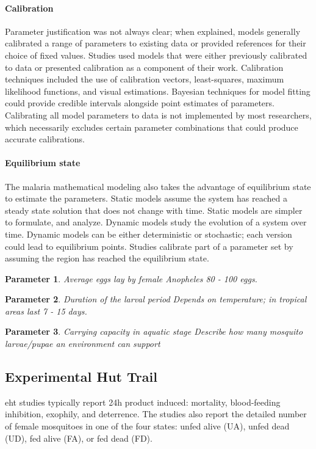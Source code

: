 \documentclass[a4paper, 12pt, twoside]{article}
\newtheorem{parameter}{Parameter}
\begin{document}
\paragraph{Calibration}%
\label{par:calibration}
Parameter justification was not always clear\cite{Gurarie2007,Arifin2011a,NiazArifin2013}; when explained, models generally calibrated a range of parameters to existing data or provided references for their choice of fixed values.
Studies used models that were either previously calibrated to data or presented calibration as a component of their work.
Calibration techniques included the use of calibration vectors, least-squares, maximum likelihood functions, and visual estimations.
Bayesian techniques for model fitting could provide credible intervals alongside point estimates of parameters.
Calibrating all model parameters to data is not implemented by most researchers, which necessarily excludes certain parameter combinations that could produce accurate calibrations.

\paragraph{Equilibrium state}%
\label{par:equilibrium_state}
The malaria mathematical modeling also takes the advantage of equilibrium state to estimate the parameters\cite{Alves2021}.
Static models assume the system has reached a steady state solution that does not change with time.
Static models are simpler to formulate, and analyze.
Dynamic models study the evolution of a system over time.
Dynamic models can be either deterministic or stochastic; each version could lead to equilibrium points.
Studies calibrate part of a parameter set by assuming the region has reached the equilibrium state.

\begin{parameter}
	{Average eggs lay by female \textit{Anopheles}}
	80 - 100 eggs.
\end{parameter}

\begin{parameter}
	{Duration of the larval period}
	Depends on temperature; in tropical areas last 7 - 15 days.\cite{bayoh_lindsay_2003}
\end{parameter}

\begin{parameter}
	{Carrying capacity in aquatic stage}
	Describe how many mosquito larvae/pupae an environment can support
\end{parameter}

\subsection{Experimental Hut Trail}
\gls{eht} studies typically report 24h product induced: mortality, blood-feeding inhibition, exophily, and deterrence.
The studies also report the detailed number of female mosquitoes in one of the four states: unfed alive (UA), unfed dead (UD), fed alive (FA), or fed dead (FD).
\end{document}
